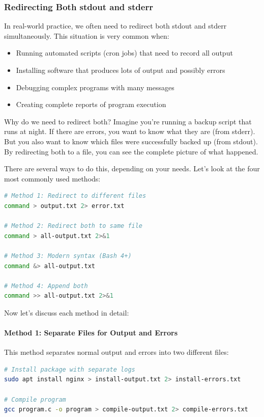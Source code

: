 \subsubsection{Redirecting Both stdout and stderr}

In real-world practice, we often need to redirect both stdout and stderr simultaneously. This situation is very common when:

\begin{itemize}
	\item Running automated scripts (cron jobs) that need to record all output
	\item Installing software that produces lots of output and possibly errors
	\item Debugging complex programs with many messages
	\item Creating complete reports of program execution
\end{itemize}

Why do we need to redirect both? Imagine you're running a backup script that runs at night. If there are errors, you want to know what they are (from stderr). But you also want to know which files were successfully backed up (from stdout). By redirecting both to a file, you can see the complete picture of what happened.

There are several ways to do this, depending on your needs. Let's look at the four most commonly used methods:

\begin{lstlisting}[language=bash, caption={Redirecting stdout and stderr}]
# Method 1: Redirect to different files
command > output.txt 2> error.txt

# Method 2: Redirect both to same file
command > all-output.txt 2>&1

# Method 3: Modern syntax (Bash 4+)
command &> all-output.txt

# Method 4: Append both
command >> all-output.txt 2>&1
\end{lstlisting}

Now let's discuss each method in detail:

\paragraph{Method 1: Separate Files for Output and Errors}

This method separates normal output and errors into two different files:

\begin{lstlisting}[language=bash, caption={Method 1 example - separate files}]
# Install package with separate logs
sudo apt install nginx > install-output.txt 2> install-errors.txt

# Compile program
gcc program.c -o program > compile-output.txt 2> compile-errors.txt
\end{lstlisting}

